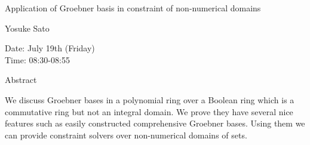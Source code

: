 \begin{center}
\LARGE
Application of Groebner basis in constraint of
                    non-numerical domains
\end{center}

\begin{center}
\Large
Yosuke Sato

\end{center}

\noindent
Date:  July 19th (Friday)\\
Time:  08:30-08:55\\

\begin{center}
\large
Abstract
\end{center}

We discuss Groebner bases in a polynomial ring over a Boolean ring which is a commutative ring
but not an integral domain. We prove they have several nice features such as easily constructed
comprehensive Groebner bases. Using them we can provide constraint solvers over non-numerical
domains of sets. 
